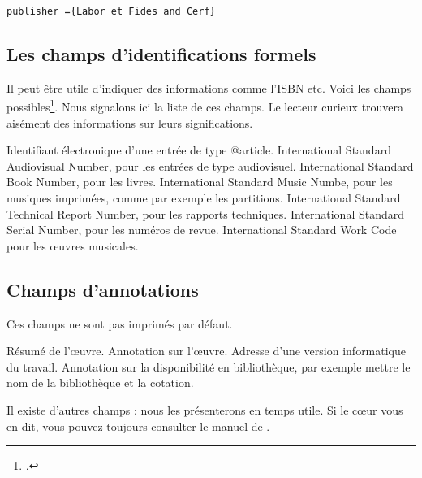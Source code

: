 \begin{verbatim}
publisher ={Labor et Fides and Cerf}
\end{verbatim}

\subsection{Les champs d'identifications formels}

Il peut être utile d'indiquer des informations comme l'ISBN etc. Voici les champs possibles\footcite[BibLaTeX imprimera ces champs par défaut, il est toutefois possible de ne pas les afficher en passant une option au chargement du package]{explicationisbn}. Nous signalons ici la liste de ces champs. Le lecteur curieux trouvera aisément des informations sur leurs significations.

\begin{fieldlist}
	 Identifiant électronique d'une entrée de type @article. 
   	 \textenglish{International Standard Audiovisual Number}, pour les entrées de type audiovisuel.
   	 \textenglish{International Standard Book Number}, pour les livres. 
   	 \textenglish{International Standard Music Numbe}, pour les musiques imprimées, comme par exemple les partitions. 
   	 \textenglish{International Standard Technical Report Number}, pour les rapports techniques. 
   	 \textenglish{International Standard Serial Number}, pour les numéros de revue. 
   	 \textenglish{International Standard Work Code} pour les œuvres musicales.
\end{fieldlist}

\subsection{Champs d'annotations}

Ces champs ne sont pas imprimés par défaut. 

\begin{fieldlist}
	 Résumé de l'œuvre. 
   	 Annotation sur l'œuvre.
   	 Adresse d'une version informatique du travail. 
   	 Annotation sur la disponibilité en bibliothèque, par exemple mettre le nom de la bibliothèque et la cotation.
	
\end{fieldlist}

Il existe d'autres champs : nous les présenterons en temps utile. Si le cœur vous en dit, vous pouvez toujours consulter le manuel de .